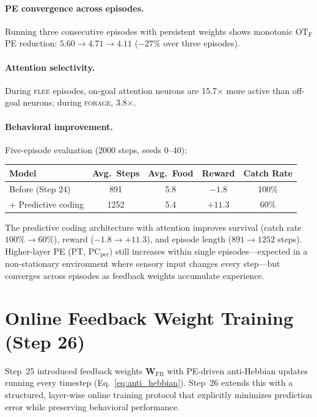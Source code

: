 \documentclass[11pt,a4paper]{article}
\begin{document}
\paragraph{PE convergence across episodes.}
Running three consecutive episodes with persistent weights shows
monotonic OT$_\text{F}$ PE reduction:
$5.60 \to 4.71 \to 4.11$ ($-27\%$ over three episodes).

\paragraph{Attention selectivity.}
During \textsc{flee} episodes, on-goal attention neurons are 15.7$\times$
more active than off-goal neurons; during \textsc{forage}, 3.8$\times$.

\paragraph{Behavioral improvement.}
Five-episode evaluation (2000 steps, seeds 0--40):
\begin{center}
\begin{tabular}{lcccc}
\toprule
Model & Avg.\ Steps & Avg.\ Food & Reward & Catch Rate \\
\midrule
Before (Step 24)       & 891  & 5.8 & $-1.8$   & 100\% \\
+ Predictive coding    & 1252 & 5.4 & $+11.3$  &  60\% \\
\bottomrule
\end{tabular}
\end{center}
The predictive coding architecture with attention improves survival
(catch rate $100\% \to 60\%$), reward ($-1.8 \to +11.3$), and episode
length ($891 \to 1252$ steps).
Higher-layer PE (PT, PC$_\text{per}$) still increases within single
episodes---expected in a non-stationary environment where sensory input
changes every step---but converges across episodes as feedback weights
accumulate experience.

\section{Online Feedback Weight Training (Step 26)}\label{sec:wfb_training}

Step~25 introduced feedback weights $\mathbf{W}_\text{FB}$ with PE-driven
anti-Hebbian updates running every timestep (Eq.~\ref{eq:anti_hebbian}).
Step~26 extends this with a structured, layer-wise online training protocol
that explicitly minimizes prediction error while preserving behavioral
performance.
\end{document}

